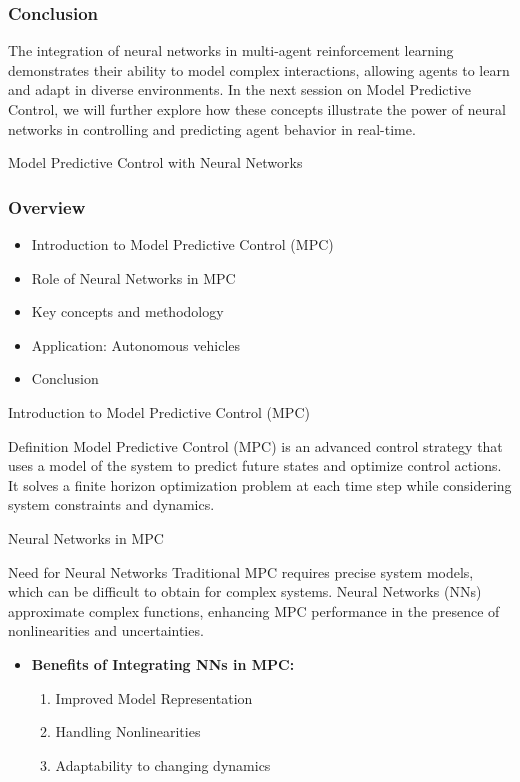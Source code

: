 \documentclass[aspectratio=169]{beamer}
\begin{document}
\begin{frame}[fragile]
    \frametitle{Conclusion}
    The integration of neural networks in multi-agent reinforcement learning demonstrates their ability to model complex interactions, allowing agents to learn and adapt in diverse environments. 
    In the next session on Model Predictive Control, we will further explore how these concepts illustrate the power of neural networks in controlling and predicting agent behavior in real-time.
\end{frame}

\begin{frame}{Model Predictive Control with Neural Networks}
    \frametitle{Overview}
    \begin{itemize}
        \item Introduction to Model Predictive Control (MPC)
        \item Role of Neural Networks in MPC
        \item Key concepts and methodology
        \item Application: Autonomous vehicles
        \item Conclusion
    \end{itemize}
\end{frame}

\begin{frame}{Introduction to Model Predictive Control (MPC)}
    \begin{block}{Definition}
        Model Predictive Control (MPC) is an advanced control strategy that uses a model of the system to predict future states and optimize control actions. It solves a finite horizon optimization problem at each time step while considering system constraints and dynamics.
    \end{block}
\end{frame}

\begin{frame}{Neural Networks in MPC}
    \begin{block}{Need for Neural Networks}
        Traditional MPC requires precise system models, which can be difficult to obtain for complex systems. Neural Networks (NNs) approximate complex functions, enhancing MPC performance in the presence of nonlinearities and uncertainties.
    \end{block}
    
    \begin{itemize}
        \item \textbf{Benefits of Integrating NNs in MPC:}
        \begin{enumerate}
            \item Improved Model Representation
            \item Handling Nonlinearities
            \item Adaptability to changing dynamics
        \end{enumerate}
    \end{itemize}
\end{frame}
\end{document}
